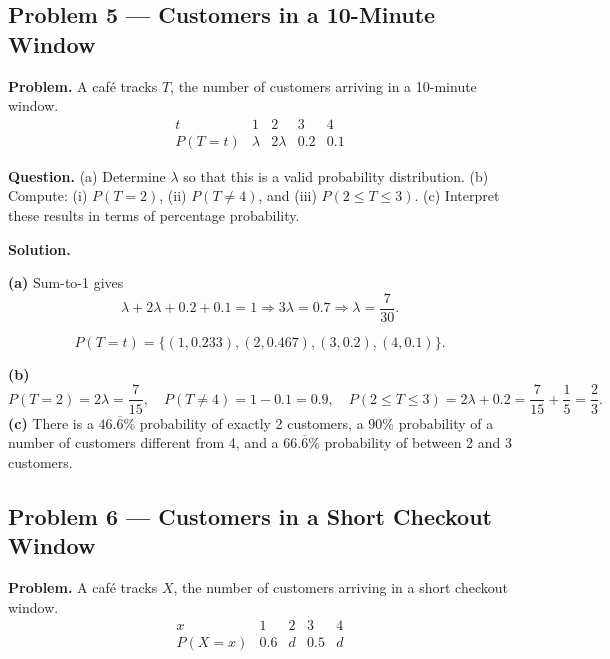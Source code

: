 \begin{ExamProblems}
		
		\item
		\subsection*{Problem 5 — Customers in a 10-Minute Window}
		
		\textbf{Problem.}
		A café tracks $T$, the number of customers arriving in a 10-minute window.
		\[
		\begin{array}{c|cccc}
			t & 1 & 2 & 3 & 4\\
			\hline
			P(T=t) & \lambda & 2\lambda & 0.2 & 0.1
		\end{array}
		\]
		
		\textbf{Question.}
		(a) Determine $\lambda$ so that this is a valid probability distribution.
		(b) Compute: (i) $P(T=2)$, (ii) $P(T\ne 4)$, and (iii) $P(2\le T\le 3)$.
		(c) Interpret these results in terms of percentage probability.
		
		\textbf{Solution.}

		\textbf{(a)} Sum-to-1 gives
		\[
		\lambda+2\lambda+0.2+0.1=1\Rightarrow 3\lambda=0.7\Rightarrow \lambda=\frac{7}{30}.
		\]

		
\[
		P(T=t)=\{(1,0.233),(2,0.467),(3,0.2),(4,0.1)\}.
		\]
\begin{center}
		\end{center}
\textbf{(b)}
		\[
		P(T=2)=2\lambda=\frac{7}{15},\quad
		P(T\ne 4)=1-0.1=0.9,\quad
		P(2\le T\le 3)=2\lambda+0.2=\frac{7}{15}+\frac{1}{5}=\frac{2}{3}.
		\]
		\textbf{(c)} There is a $46.\overline{6}\%$ probability of exactly 2 customers, a $90\%$ probability of a number of customers different from 4, and a $66.\overline{6}\%$ probability of between 2 and 3 customers.
		
		
		\item
		\subsection*{Problem 6 — Customers in a Short Checkout Window}
			\textbf{Problem.}
		A café tracks $X$, the number of customers arriving in a short checkout window.
		\[
		\begin{array}{c|cccc}
			x & 1 & 2 & 3 & 4\\
			\hline
			P(X=x) & 0.6 & d & 0.5 & d
		\end{array}
		\]
		

\end{ExamProblems}
